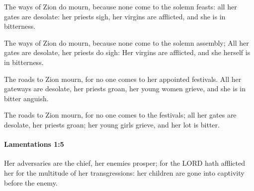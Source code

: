			The ways of Zion do mourn, because none come to the solemn feasts: all her gates are desolate: her priests sigh, her virgins are afflicted, and she is in bitterness.

			\begin{versebox}
					\item[BHS] 
					\item[LXX] 
					\item[ASV] The ways of Zion do mourn, because none come to the solemn assembly; All her gates are desolate, her priests do sigh: Her virgins are afflicted, and she herself is in bitterness.
					\item[NIV] The roads to Zion mourn, for no one comes to her appointed festivals. All her gateways are desolate, her priests groan, her young women grieve, and she is in bitter anguish.
					\item[NRSV] The roads to Zion mourn, for no one comes to the festivals; all her gates are desolate, her priests groan; her young girls grieve, and her lot is bitter.
			\end{versebox}

		\paragraph{Lamentations 1:5} %
			\label{LAMENTATIONS-1-5}

			Her adversaries are the chief, her enemies prosper; for the LORD hath afflicted her for the multitude of her transgressions: her children are gone into captivity before the enemy.


